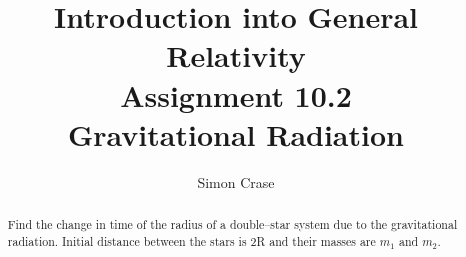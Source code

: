 \documentclass[]{article}
\title{Introduction into General Relativity\\Assignment 10.2\\Gravitational Radiation}
\author{Simon Crase}
\begin{document}
\maketitle

\begin{abstract}
Find the change in time of the radius of a double--star system due to the gravitational radiation. Initial distance between the stars is 2R and their masses are $m_1$ and $m_2$.
\end{abstract}

\section{}
\end{document}

